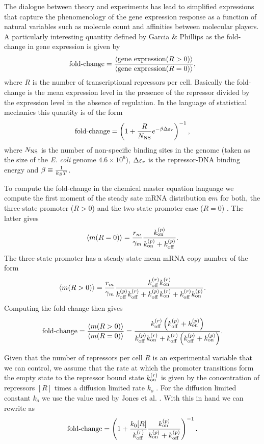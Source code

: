The dialogue between theory and experiments has lead to simplified expressions
that capture the phenomenology of the gene expression response as a function of
natural variables such as molecule count and affinities between molecular
players. A particularly interesting quantity defined by Garcia \& Phillips
\cite{Garcia2011c} as the fold-change in gene expression is given by
\begin{equation}
  \text{fold-change} = {\left\langle \text{gene expression}(R > 0) \right\rangle \over
                 \left\langle \text{gene expression}(R = 0) \right\rangle},
\end{equation}
where $R$ is the number of transcriptional repressors per cell. Basically the
fold-change is the mean expression level in the presence of the repressor
divided by the expression level in the absence of regulation. In the language of
statistical mechanics this quantity is of the form \cite{Garcia2011c}
\begin{equation}
  \text{fold-change} = \left( 1 + {R \over N_\text{NS}} e^{-\beta\Delta\varepsilon_r} \right)^{-1},
  \label{eq_fc_thermo}
\end{equation}
where $N_\text{NS}$ is the number of non-specific binding sites in the genome (taken
as the size of the \textit{E. coli} genome $4.6\times 10^6$), $\Delta\varepsilon_r$ is the
repressor-DNA binding energy and $\beta \equiv {1 \over k_BT}$.

To compute the fold-change in the chemical master equation language we compute
the first moment of the steady sate mRNA distribution $\ee{m}$ for both, the
three-state promoter ($R>0$) and the two-state promoter case ($R=0$)
. The latter gives
\begin{equation}
  \left\langle m (R = 0) \right\rangle = {r_m \over \gamma _m} {k^{(p)}_{\text{on}} \over k^{(p)}_{\text{on}} + k^{(p)}_{\text{off}}}.
\end{equation}
The three-state promoter has a steady-state mean mRNA copy number of the form
\begin{equation}
  \left\langle m (R > 0) \right\rangle = {r_m \over \gamma _m} {k^{(r)}_{\text{off}}k^{(r)}_{\text{on}}
  \over k^{(p)}_{\text{off}}k^{(r)}_{\text{off}} + k^{(p)}_{\text{off}}k^{(r)}_{\text{on}} + k^{(r)}_{\text{off}}k^{(p)}_{\text{on}}}.
\end{equation}
Computing the fold-change then gives
\begin{equation}
  \text{fold-change} = {\left\langle m (R > 0) \right\rangle \over \left\langle m (R = 0) \right\rangle} =
  {k^{(r)}_{\text{off}} \left( k^{(p)}_{\text{off}} + k^{(p)}_{\text{on}} \right) \over
  k^{(p)}_{\text{off}}k^{(r)}_{\text{on}} + k^{(r)}_{\text{off}} \left( k^{(p)}_{\text{off}} + k^{(p)}_{\text{on}} \right)}.
  \label{eq_fold_change_cme}
\end{equation}

Given that the number of repressors per cell $R$ is an experimental variable
that we can control, we assume that the rate at which the promoter transitions
form the empty state to the repressor bound state $k^{(r)}_{\text{on}}$ is given by the
concentration of repressors $[R]$ times a diffusion limited rate $k_o$
\cite{Jones2014a}.  For the diffusion limited constant $k_o$ we use the value
used by Jones et al. \cite{Jones2014a} . With this in hand we can rewrite
 as
\begin{equation}
  \text{fold-change} = \left( 1 + {k_0 [R] \over k^{(r)}_{\text{off}}}
                {k^{(p)}_{\text{on}} \over k^{(p)}_{\text{on}} + k^{(p)}_{\text{off}}} \right)^{-1}.
  \label{eq_fc_kinetic}
\end{equation}

